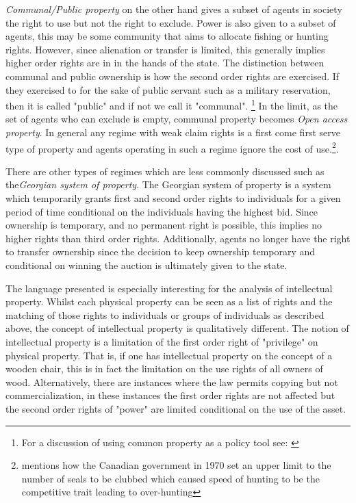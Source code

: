 \documentclass[12pt]{article}
\numberwithin{equation}{section}
\begin{document}
\textit{Communal/Public property} on the other hand gives a subset of agents in society the right to use but not the right to exclude. Power is also given to a subset of agents, this may be some community that aims to allocate fishing or hunting rights.
However, since alienation or transfer is limited, this generally implies higher order rights are in in the hands of the state. The distinction between communal and public ownership is how the second order rights are exercised. If they exercised to for the sake of public servant such as a military reservation, then it is called "public" and if not we call it "communal". \footnote{For a discussion of using common property as a policy tool see: \cite{ciriacy1975common}} In the limit, as the set of agents who can exclude is empty, communal property becomes \textit{Open access property}. In general any regime with weak claim rights is a first come first serve type of property and agents operating in such a regime ignore the cost of use.\footnote{\cite{Alchian1973} mentions how the Canadian government in 1970 set an upper limit to the number of seals to be clubbed which caused speed of hunting to be the competitive trait leading to over-hunting}.

There are other types of regimes which are less commonly discussed such as the\textit{Georgian system of property}. The Georgian system of property is a system which temporarily grants first and second order rights to individuals for a given period of time conditional on the individuals having the highest bid. Since ownership is temporary, and no permanent right is possible, this implies no higher rights than third order rights. Additionally, agents no longer have the right to transfer ownership since the decision to keep ownership temporary and conditional on winning the auction is ultimately given to the state.

The language presented is especially interesting for the analysis of intellectual property. Whilst each physical property can be seen as a list of rights and the matching of those rights to individuals or groups of individuals as described above, the concept of intellectual property is qualitatively different. The notion of intellectual property is a limitation of the first order right of "privilege" on physical property. That is, if one has intellectual property on the concept of a wooden chair, this is in fact the limitation on the use rights of all owners of wood. Alternatively, there are instances where the law permits copying but not commercialization, in these instances the first order rights are not affected but the second order rights of "power" are limited conditional on the use of the asset.
\end{document}
